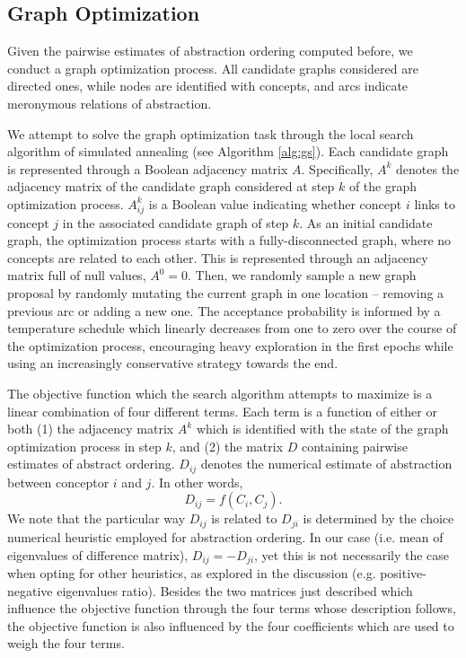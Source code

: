 \subsection{Graph Optimization}

Given the pairwise estimates of abstraction ordering computed before, we conduct a graph optimization process. All candidate graphs considered are directed ones, while nodes are identified with concepts, and arcs indicate meronymous relations of abstraction.

We attempt to solve the graph optimization task through the local search algorithm of simulated annealing (see Algorithm \ref{alg:gs}). Each candidate graph is represented through a Boolean adjacency matrix $A$. Specifically, $A^k$ denotes the adjacency matrix of the candidate graph considered at step $k$ of the graph optimization process. $A^k_{ij}$ is a Boolean value indicating whether concept $i$ links to concept $j$ in the associated candidate graph of step $k$. As an initial candidate graph, the optimization process starts with a fully-disconnected graph, where no concepts are related to each other. This is represented through an adjacency matrix full of null values, $A^0 = 0$. Then, we randomly sample a new graph proposal by randomly mutating the current graph in one location -- removing a previous arc or adding a new one. The acceptance probability is informed by a temperature schedule which linearly decreases from one to zero over the course of the optimization process, encouraging heavy exploration in the first epochs while using an increasingly conservative strategy towards the end.

The objective function which the search algorithm attempts to maximize is a linear combination of four different terms. Each term is a function of either or both (1) the adjacency matrix $A^k$ which is identified with the state of the graph optimization process in step $k$, and (2) the matrix $D$ containing pairwise estimates of abstract ordering. $D_{ij}$ denotes the numerical estimate of abstraction between conceptor $i$ and $j$. In other words, $$D_{ij} = f(C_i, C_j).$$ We note that the particular way $D_{ij}$ is related to $D_{ji}$ is determined by the choice numerical heuristic employed for abstraction ordering. In our case (i.e. mean of eigenvalues of difference matrix), $D_{ij} = -D_{ji}$, yet this is not necessarily the case when opting for other heuristics, as explored in the discussion (e.g. positive-negative eigenvalues ratio). Besides the two matrices just described which influence the objective function through the four terms whose description follows, the objective function is also influenced by the four coefficients which are used to weigh the four terms.

